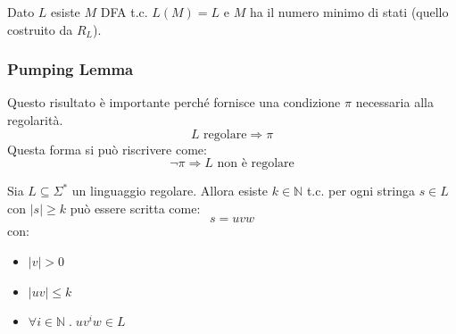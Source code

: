 \documentclass[a4paper]{article}
\begin{document}
\thm{}
{
  Dato $L$ esiste $M$ DFA t.c. $L(M) = L$ e $M$ ha il numero minimo di stati (quello costruito da $R_L$).
}

\subsubsection{Pumping Lemma}

Questo risultato è importante perché fornisce una condizione $\pi$ necessaria alla regolarità.
\[L \text{ regolare} \Longrightarrow \pi\]
Questa forma si può riscrivere come:
\[\neg \pi \Longrightarrow L \text{ non è regolare}\]

{
  Sia $L \subseteq \Sigma^*$ un linguaggio regolare.
  Allora esiste  $k \in \mathbb{N}$ t.c. per ogni stringa $s \in L$ con $|s| \ge k$ 
  può essere scritta come:
  \[s = uvw\]
  con:
  \begin{itemize}
    \item $|v| > 0$
    \item $|uv| \le k$
    \item $\forall i \in \mathbb{N} \; . \;  uv^iw \in L$
  \end{itemize}
}
\end{document}
